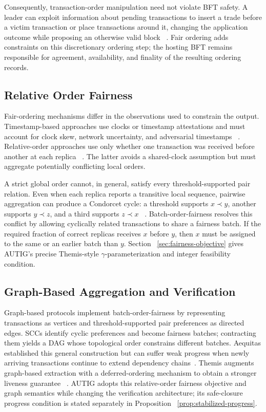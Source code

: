 Consequently, transaction-order manipulation need not violate BFT safety. A
leader can exploit information about pending transactions to insert a trade
before a victim transaction or place transactions around it, changing the
application outcome while proposing an otherwise valid block
~\cite{daian2020flash,heimbach2022sok,malkhi2022maximal}. Fair ordering adds
constraints on this discretionary ordering step; the hosting BFT remains
responsible for agreement, availability, and finality of the resulting
ordering records.

\subsection{Relative Order Fairness}
\label{sec:background_order_fairness}

Fair-ordering mechanisms differ in the observations used to constrain the
output. Timestamp-based approaches use clocks or timestamp attestations and
must account for clock skew, network uncertainty, and adversarial timestamps
~\cite{zhang2020byzantine,kursawe2020wendy}. Relative-order approaches use only
whether one transaction was received before another at each replica
~\cite{kelkar2020order,kelkar2023themis}. The latter avoids a shared-clock
assumption but must aggregate potentially conflicting local orders.

A strict global order cannot, in general, satisfy every threshold-supported
pair relation. Even when each replica reports a transitive local sequence,
pairwise aggregation can produce a Condorcet cycle: a threshold supports
$x\prec y$, another supports $y\prec z$, and a third supports $z\prec x$
~\cite{gehrlein1983condorcet}. Batch-order-fairness resolves this conflict by
allowing cyclically related transactions to share a fairness batch. If the
required fraction of correct replicas receives $x$ before $y$, then $x$ must
be assigned to the same or an earlier batch than $y$. Section
~\ref{sec:fairness-objective} gives AUTIG's precise Themis-style
$\gamma$-parameterization and integer feasibility condition.

\subsection{Graph-Based Aggregation and Verification}
\label{sec:background_architectures}

Graph-based protocols implement batch-order-fairness by representing
transactions as vertices and threshold-supported pair preferences as directed
edges. SCCs identify cyclic preferences and become fairness batches;
contracting them yields a DAG whose topological order constrains different
batches. Aequitas established this general construction but can suffer weak
progress when newly arriving transactions continue to extend dependency
chains~\cite{kelkar2020order}. Themis augments graph-based extraction with a
deferred-ordering mechanism to obtain a stronger liveness guarantee
~\cite{kelkar2023themis}. AUTIG adopts this relative-order fairness objective
and graph semantics while changing the verification architecture; its
safe-closure progress condition is stated separately in Proposition
~\ref{prop:stabilized-progress}.

